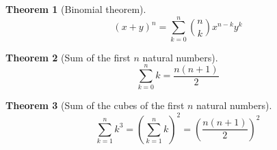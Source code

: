 \documentclass{book}
\theoremstyle{plain}%
\newtheorem{thm}{Theorem}[section]
\theoremstyle{definition}
\theoremstyle{remark}
\begin{document}
\begin{thm}[Binomial theorem]
	\begin{equation}
		(x + y)^n = \sum_{k = 0}^{n} \binom{n}{k} x^{n - k} y^k
	\end{equation}
\end{thm}

\begin{thm}[Sum of the first $n$ natural numbers]
	\begin{equation}
		\sum_{k = 0}^{n} k = \frac{n (n + 1)}{2}
	\end{equation}
\end{thm}

\begin{thm}[Sum of the cubes of the first $n$ natural numbers]
	\begin{equation}
		\sum_{k = 1}^{n} k^3 = \left( \sum_{k = 1}^{n} k \right)^2 = \left(\frac{n (n + 1)}{2} \right)^2
	\end{equation}
\end{thm}
\end{document}

